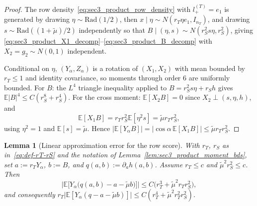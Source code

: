 \documentclass[10pt]{article}
\newtheorem{lemma}{Lemma}
\newcommand{\Ebb}{\mathbb E}
\newcommand{\trg}{T}
\newcommand{\nT}{n_{\trg}}
\begin{document}
\begin{proof}
The row density~\eqref{eq:sec3_product_row_density} with $l^{(\trg)}_+=e_1$ is
generated by drawing $\eta\sim\mathrm{Rad}(1/2)$, then
$x\mid\eta\sim N(r_T\eta e_1,I_{\nT})$, and drawing
$s\sim\mathrm{Rad}((1+\tilde\mu)/2)$ independently so that
$B\mid(\eta,s)\sim N(r_S^2 s\eta,r_S^2)$, giving
\eqref{eq:sec3_product_X1_decomp}--\eqref{eq:sec3_product_B_decomp} with
$X_2=g_2\sim N(0,1)$ independent.

Conditional on $\eta$, $(Y_\alpha,Z_\alpha)$ is a rotation of $(X_1,X_2)$
with mean bounded by $r_T\le1$ and identity covariance, so moments through
order $6$ are uniformly bounded.  For $B$: the $L^4$ triangle inequality
applied to $B=r_S^2 s\eta+r_S h$ gives $\Ebb|B|^4\le C(r_S^8+r_S^4)$.
For the cross moment: $\Ebb[X_2 B]=0$ since $X_2\perp(s,\eta,h)$, and
\[
    \Ebb[X_1 B]=r_T r_S^2\Ebb[\eta^2 s]=\tilde\mu r_T r_S^2,
\]
using $\eta^2=1$ and $\Ebb[s]=\tilde\mu$.  Hence
$|\Ebb[Y_\alpha B]|=|\cos\alpha\,\Ebb[X_1 B]|\le\tilde\mu r_T r_S^2$.
\end{proof}

\begin{lemma}[Linear approximation error for the row score]
\label{lem:sec3_product_approx_error}
With $r_T$, $r_S$ as in~\eqref{eq:def-rT-rS} and the notation of
Lemma~\ref{lem:sec3_product_moment_bds}, set $a:=r_T Y_\alpha$, $b:=B$,
and $q(a,b):=\partial_a h(a,b)$.  Assume $r_T\le c$ and
$\tilde\mu^2 r_S^2\le c$.  Then
\begin{equation}
\label{eq:sec3_product_approx_error}
    \bigl|\Ebb\bigl[Y_\alpha\bigl(q(a,b)-a-\tilde\mu b\bigr)\bigr]\bigr|
    \le
    C\bigl(r_T^3+\tilde\mu^2 r_T r_S^2\bigr),
\end{equation}
and consequently
$r_T\bigl|\Ebb[Y_\alpha(q-a-\tilde\mu b)]\bigr|\le C(r_T^4+\tilde\mu^2 r_T^2 r_S^2)$.
\end{lemma}
\end{document}

